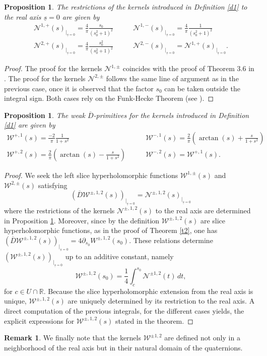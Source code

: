 \documentclass[reqno,11pt]{amsart}
\numberwithin{equation}{section}
\newcommand{\uns}{\underline{s}}
\newtheorem{proposition}[theorem]{Proposition}
\theoremstyle{definition}
\newtheorem{remark}[theorem]{{\bf Remark}}
\begin{document}
\begin{proposition}\label{p1} The restrictions of the kernels introduced in Definition \ref{d1} to the real axis $\uns=0$ are given by
	\begin{align*}
		\mathcal N^{1,+}(s)_{|_{\uns=0}}= \frac{4}\pi \frac{s_0}{(s_0^2+1)^{2}} & \quad\quad
		\mathcal N^{1,-}(s)_{|_{\uns=0}}=\frac{4}\pi \frac{1}{(s_0^2+1)^{2}}\\
		\mathcal N^{2,+}(s)_{|_{\uns=0}}=\frac{4}\pi \frac{s_0^2}{(s_0^2+1)^{2}} &\quad\quad
		\mathcal N^{2,-}(s)_{|_{\uns=0}}=\mathcal N^{1,+}(s)_{|_{\uns=0}}.
	\end{align*}
\end{proposition}
\begin{proof}
	The proof for the kernels $\mathcal N^{1,\pm}$ coincides with the proof of Theorem 3.6 in \cite{CSSinve}.
	The proof for the kernels $\mathcal N^{2,\pm}$ follows the same line of argument as in the previous case, once it is observed that the factor $s_0$ can be taken outside the integral sign.
	Both cases rely on the Funk-Hecke Theorem (see  \cite{HOCH}).
\end{proof}
\begin{proposition}\label{restriction}
	The weak $\overline D$-primitives for the kernels introduced in Definition \ref{d1} are given by
	\begin{align*}
		\mathcal W^{+,1}(s)=\frac{-2}{\pi} \frac{1}{1+s^2} &\quad\quad \mathcal W^{-,1}(s)=\frac{2}{\pi} \left(\arctan(s) + \frac{s}{1+s^2} \right) \\
		\mathcal W^{+,2}(s)=\frac{2}{\pi} \left(\arctan(s) - \frac{s}{1+s^2} \right) &\quad\quad \mathcal W^{-,2}(s)=\mathcal W^{+,1}(s).
	\end{align*}
\end{proposition}
\begin{proof}
	We seek the left slice hyperholomorphic functions $\mathcal W^{1,\pm}(s)$ and $\mathcal W^{2,\pm}(s)$ satisfying
	$$ (\overline D \mathcal W^{\pm,1,2}(s))_{|_{\uns=0}}= \mathcal N^{\pm, 1,2}(s)_{|_{\uns=0}}$$
	where the restrictions of the kernels $\mathcal N^{\pm, 1,2}(s)$ to the real axis are determined in Proposition \ref{p1}. Moreover, since by the definition $\mathcal W^{\pm, 1,2}(s)$ are slice hyperholomorphic functions, as in the proof of Theorem \ref{t2}, one has $(\overline D \mathcal W^{\pm, 1,2}(s))_{|_{\uns=0}}=4\partial_{s_0} W^{\pm, 1,2}(s_0)$. These relations determine $(\mathcal W^{\pm, 1,2}(s))_{|_{\uns=0}}$ up to an additive constant, namely
	$$ \mathcal W^{\pm,1,2}(s_0) =\frac 14 \int_c^{s_0} \mathcal N^{\pm 1,2}(t) \, dt, $$
	for $c\in U\cap\mathbb R$. Because the slice hyperholomorphic extension from the real axis is unique, $\mathcal W^{\pm, 1,2}(s)$ are uniquely determined by its restriction to the real axis. A direct computation of the previous integrals, for the different cases yields, the explicit expressions for $\mathcal{W}^{\pm, 1,2}(s)$ stated in the theorem.
\end{proof}
\begin{remark}
We finally note that the kernels $\mathcal{W}^{\pm 1,2}$ are defined not only in a neighborhood of the real axis but in their natural domain of the quaternions.
\end{remark}
\end{document}

